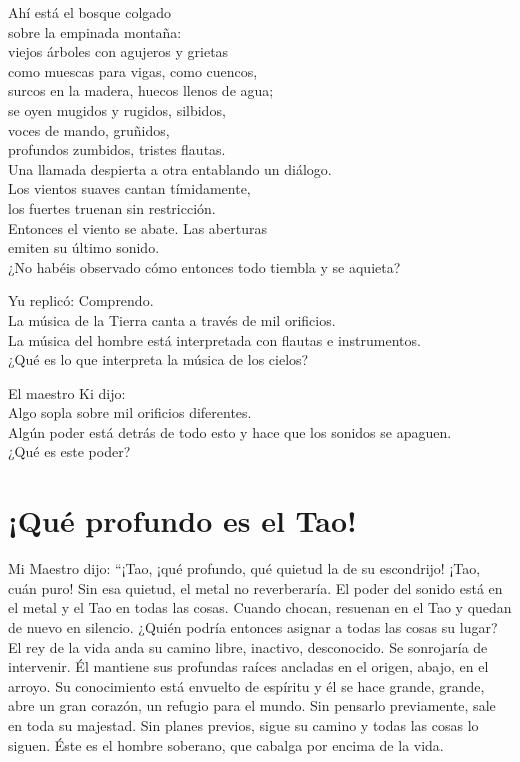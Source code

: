 \documentclass[hidelinks]{memoir}
\begin{document}
	Ahí está el bosque colgado\\
	sobre la empinada montaña:\\
	viejos árboles con agujeros y grietas\\
	como muescas para vigas, como cuencos,\\
	surcos en la madera, huecos llenos de agua;\\
	se oyen mugidos y rugidos, silbidos,\\
	voces de mando, gruñidos,\\
	profundos zumbidos, tristes flautas.\\
	Una llamada despierta a otra entablando un diálogo.\\
	Los vientos suaves cantan tímidamente,\\
	los fuertes truenan sin restricción.\\
	Entonces el viento se abate. Las aberturas\\
	emiten su último sonido.\\
	¿No habéis observado cómo entonces todo tiembla y se aquieta?
	
	Yu replicó: Comprendo.\\
	La música de la Tierra canta a través de mil orificios.\\
	La música del hombre está interpretada con flautas e instrumentos.\\
	¿Qué es lo que interpreta la música de los cielos?
	
	El maestro Ki dijo:\\
	Algo sopla sobre mil orificios diferentes.\\
	Algún poder está detrás de todo esto y hace que los sonidos se
	apaguen.\\
	¿Qué es este poder?
	
	\chapter*{¡Qué profundo es el Tao!}
	
	Mi Maestro dijo: ``¡Tao, ¡qué profundo, qué quietud la de su escondrijo!
	¡Tao, cuán puro! Sin esa quietud, el metal no reverberaría. El poder del
	sonido está en el metal y el Tao en todas las cosas. Cuando chocan,
	resuenan en el Tao y quedan de nuevo en silencio. ¿Quién podría entonces
	asignar a todas las cosas su lugar? El rey de la vida anda su camino
	libre, inactivo, desconocido. Se sonrojaría de intervenir. Él mantiene
	sus profundas raíces ancladas en el origen, abajo, en el arroyo. Su
	conocimiento está envuelto de espíritu y él se hace grande, grande, abre
	un gran corazón, un refugio para el mundo. Sin pensarlo previamente,
	sale en toda su majestad. Sin planes previos, sigue su camino y todas
	las cosas lo siguen. Éste es el hombre soberano, que cabalga por encima
	de la vida.
	
\end{document}
